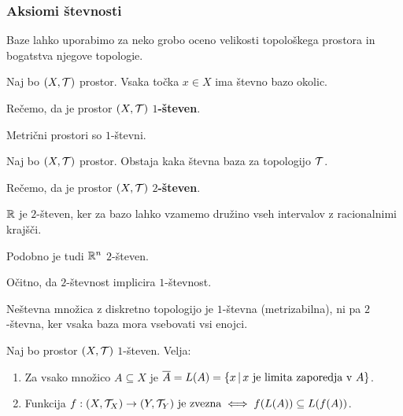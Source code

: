 \subsubsection{Aksiomi števnosti}

Baze lahko uporabimo za neko grobo oceno velikosti topološkega prostora in bogatstva njegove topologie.

\begin{definicija}
    Naj bo $(X, \mathcal{T})$ prostor. Vsaka točka $x \in X$ ima števno bazo okolic.

    Rečemo, da je prostor $(X, \mathcal{T})$ \textbf{$1$-števen}. 
\end{definicija}

\begin{primer}
    Metrični prostori so $1$-števni.
\end{primer}

\begin{definicija}
    Naj bo $(X, \mathcal{T})$ prostor. Obstaja kaka števna baza za topologijo $\mathcal{T}$.

    Rečemo, da je prostor $(X, \mathcal{T})$ \textbf{$2$-števen}. 
\end{definicija}

\begin{primer}
    $\mathbb{R}$ je $2$-števen, ker za bazo lahko vzamemo družino vseh intervalov z racionalnimi krajšči. 
    
    Podobno je tudi $\mathbb{R}^n$ $2$-števen.
\end{primer}

\begin{opomba}
    Očitno, da $2$-števnost implicira $1$-števnost.
\end{opomba}

\begin{primer}
    Neštevna množica z diskretno topologijo je $1$-števna (metrizabilna), ni pa $2$-števna, ker vsaka baza mora vsebovati vsi enojci.
\end{primer}

\begin{trditev}
    Naj bo prostor $(X, \mathcal{T})$ $1$-števen. Velja:
    \begin{enumerate}
        \item Za vsako množico $A \subseteq X$ je $\overline{A} = L(A) = \{x \,|\, x \text{ je limita zaporedja v } A\}$.
        \item Funkcija $f: (X, \mathcal{T}_X) \to (Y, \mathcal{T}_Y) \text{ je zvezna} \iff f(L(A)) \subseteq L(f(A))$.
    \end{enumerate}
\end{trditev}

